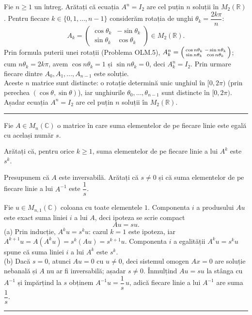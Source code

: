Fie $n\ge1$ un întreg. Arătați că ecuația $A^n=I_2$ are cel puțin $n$ soluții în $M_2(\mathbb{R})$.
\sol Pentru fiecare $k\in\{0,1,\dots,n-1\}$ considerăm rotația de unghi $\theta_k=\dfrac{2k\pi}{n}$:
\[ A_k=\begin{pmatrix}\cos\theta_k & -\sin\theta_k\\ \sin\theta_k & \cos\theta_k\end{pmatrix}\in M_2(\mathbb{R}). \]
Prin formula puterii unei rotații (Problema OLM.5), $A_k^n=\begin{psmallmatrix}\cos n\theta_k & -\sin n\theta_k\\ \sin n\theta_k & \cos n\theta_k\end{psmallmatrix}$; cum $n\theta_k=2k\pi$, avem $\cos n\theta_k=1$ și $\sin n\theta_k=0$, deci $A_k^n=I_2$. Prin urmare fiecare dintre $A_0,A_1,\dots,A_{n-1}$ este soluție.\\[2pt]
Aceste $n$ matrice sunt distincte: o rotație determină unic unghiul în $[0,2\pi)$ (prin perechea $(\cos\theta,\sin\theta)$), iar unghiurile $\theta_0,\dots,\theta_{n-1}$ sunt distincte în $[0,2\pi)$. Așadar ecuația $A^n=I_2$ are cel puțin $n$ soluții în $M_2(\mathbb{R})$.
\vspace{1mm}\hrule

Fie $A\in M_n(\mathbb{C})$ o matrice în care suma elementelor de pe fiecare linie este egală cu același număr $s$.
\begin{parti}
  \item Arătați că, pentru orice $k\ge1$, suma elementelor de pe fiecare linie a lui $A^k$ este $s^k$.
  \item Presupunem că $A$ este inversabilă. Arătați că $s\neq0$ și că suma elementelor de pe fiecare linie a lui $A^{-1}$ este $\dfrac1s$.
\end{parti}
\sol Fie $u\in M_{n,1}(\mathbb{C})$ coloana cu toate elementele $1$. Componenta $i$ a produsului $Au$ este exact suma liniei $i$ a lui $A$, deci ipoteza se scrie compact
\[ Au=su. \]
(a) Prin inducție, $A^ku=s^ku$: cazul $k=1$ este ipoteza, iar $A^{k+1}u=A(A^ku)=s^k(Au)=s^{k+1}u$. Componenta $i$ a egalității $A^ku=s^ku$ spune că suma liniei $i$ a lui $A^k$ este $s^k$.\\[2pt]
(b) Dacă $s=0$, atunci $Au=0$ cu $u\neq0$, deci sistemul omogen $Ax=0$ are soluție nebanală și $A$ nu ar fi inversabilă; așadar $s\neq0$. Înmulțind $Au=su$ la stânga cu $A^{-1}$ și împărțind la $s$ obținem $A^{-1}u=\dfrac1s\,u$, adică fiecare linie a lui $A^{-1}$ are suma $\dfrac1s$.
\vspace{1mm}\hrule

